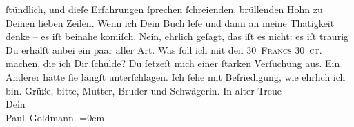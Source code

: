 \begin{ledgroupsized}[t]{13cm}
               ſtündlich, und dieſe Erfahrungen ſprechen ſchreienden, brüllenden Hohn zu Deinen
               lieben Zeilen. Wenn ich  Dein Buch leſe und dann an meine Thätigkeit denke –
                  {\pb}es iſt beinahe komiſch. Nein, ehrlich geſagt,
               das iſt es nicht: es iſt traurig{\dotsfour}\pend
           \pstart
           Du erhälſt anbei ein paar \label{K_L02622-10v}\label{K_L02622-10h}
               aller Art.\pend
           \pstart
           Was ſoll ich mit den \textsc{30 Francs 30 ct.} machen, die ich Dir
               ſchulde? Du ſetzeſt mich einer ſtarken Verſuchung aus. Ein Anderer hätte ſie längſt
               unterſchlagen. Ich ſehe mit Befriedigung, wie  ehrlich ich bin.\pend
           \pstart
           Grüße, bitte, Mutter, Bruder und Schwägerin.\pend
           \pstart
           In alter Treue{\\[\baselineskip]}Dein{\\[\baselineskip]}\spacefill\mbox{Paul Goldmann.}\pend
           \leftskip=0em{}
         
         \endnumbering{}\end{ledgroupsized}  \newcommand{\dateiname}{L02622}\newcommand{\titel}{Paul Goldmann an Arthur Schnitzler, 28. 11. 1894}\newcommand{\editorInnen}{Martin Anton Müller und Laura Untner}
      